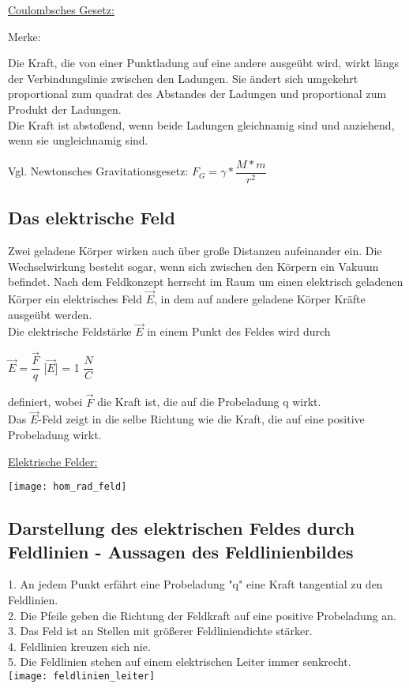 \vspace{5mm}
\underline{Coulombsches Gesetz:}

\vspace{2mm}
Merke:

Die Kraft, die von einer Punktladung auf eine andere ausgeübt wird, wirkt längs der Verbindungslinie zwischen den Ladungen. Sie ändert sich umgekehrt proportional zum quadrat des Abstandes der Ladungen und proportional zum Produkt der Ladungen. \\
Die Kraft ist abstoßend, wenn beide Ladungen gleichnamig sind und anziehend, wenn sie ungleichnamig sind. 

\vspace{3mm}
Vgl. Newtonsches Gravitationsgesetz: $ F_{G} = \gamma \ast \dfrac{M \ast m}{r^{2}} $

\newpage
\subsection{Das elektrische Feld}
Zwei geladene Körper wirken auch über große Distanzen aufeinander ein. Die Wechselwirkung besteht sogar, wenn sich zwischen den Körpern ein Vakuum befindet. Nach dem Feldkonzept herrscht im Raum um einen elektrisch geladenen Körper ein elektrisches Feld $ \vec{E} $, in dem auf andere geladene Körper Kräfte ausgeübt werden. \\
Die elektrische Feldstärke $ \vec{E} $ in einem Punkt des Feldes wird durch 

\vspace{2mm}
$ \vec{E} = \dfrac{\vec{F}}{q} $  \hspace{20mm} [$ \vec{E} $] = 1 $ \dfrac{N}{C} $

\vspace{2mm}
definiert, wobei $ \vec{F} $ die Kraft ist, die auf die Probeladung q wirkt. \\
Das $ \vec{E} $-Feld zeigt in die selbe Richtung wie die Kraft, die auf eine positive Probeladung wirkt. 

\vspace{2mm}
\underline{Elektrische Felder:}
\vspace{2mm}

\texttt{[image: hom\_rad\_feld]}

\vspace{10mm}

\subsection{Darstellung des elektrischen Feldes durch Feldlinien - Aussagen des Feldlinienbildes}
1. An jedem Punkt erfährt eine Probeladung "q" eine Kraft tangential zu den Feldlinien. \\
2. Die Pfeile geben die Richtung der Feldkraft auf eine positive Probeladung an. \\
3. Das Feld ist an Stellen mit größerer Feldliniendichte stärker. \\
4. Feldlinien kreuzen sich nie. \\
5. Die Feldlinien stehen auf einem elektrischen Leiter immer senkrecht.
\vspace{2mm} \\
\texttt{[image: feldlinien\_leiter]}

